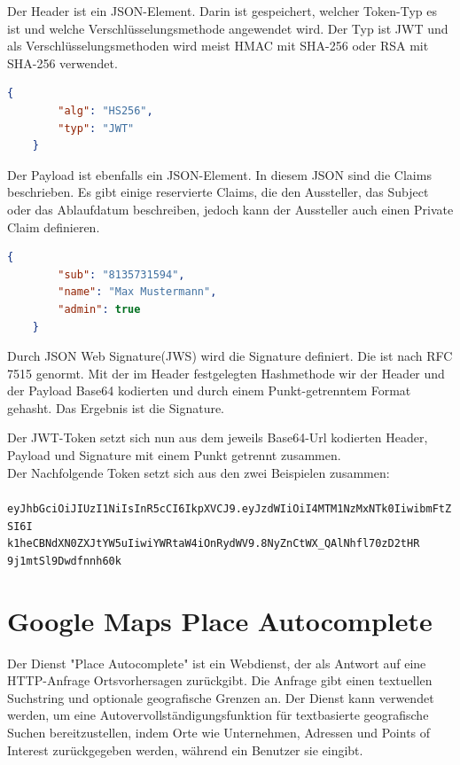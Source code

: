 Der Header ist ein JSON-Element. Darin ist gespeichert, welcher Token-Typ es ist und welche Verschlüsselungsmethode angewendet wird. Der Typ ist JWT und als Verschlüsselungsmethoden wird meist HMAC mit SHA-256 oder RSA mit SHA-256 verwendet. \autocite{wikiJWT} \\
\begin{lstlisting}[caption={JWT-Header Beispiel}, language=json]
	{
		"alg": "HS256",
		"typ": "JWT"
	}
\end{lstlisting}

Der Payload ist ebenfalls ein JSON-Element. In diesem JSON sind die Claims beschrieben. Es gibt einige reservierte Claims, die den Aussteller, das Subject oder das Ablaufdatum beschreiben, jedoch kann der Aussteller auch einen Private Claim definieren. \autocite{wikiJWT} \\
\begin{lstlisting}[caption={JWT-Payload Beispiel}, language=json]
	{
		"sub": "8135731594",
		"name": "Max Mustermann",
		"admin": true
	}
\end{lstlisting}

Durch JSON Web Signature(JWS) wird die Signature definiert. Die ist nach RFC 7515 genormt. Mit der im Header festgelegten Hashmethode wir der Header und der Payload Base64 kodierten und durch einem Punkt-getrenntem Format gehasht. Das Ergebnis ist die Signature. \autocite{wikiJWT}

Der JWT-Token setzt sich nun aus dem jeweils Base64-Url kodierten Header, Payload und Signature mit einem Punkt getrennt zusammen. \autocite{wikiJWT} \\
Der Nachfolgende Token setzt sich aus den zwei Beispielen zusammen:\\
\texttt{
	eyJhbGciOiJIUzI1NiIsInR5cCI6IkpXVCJ9.eyJzdWIiOiI4MTM1NzMxNTk0IiwibmFtZSI6I\\k1heCBNdXN0ZXJtYW5uIiwiYWRtaW4iOnRydWV9.8NyZnCtWX\_QAlNhfl70zD2tHR\\9j1mtSl9Dwdfnnh60k
}

\section{Google Maps Place Autocomplete}

Der Dienst "Place Autocomplete" ist ein Webdienst, der als Antwort auf eine HTTP-Anfrage Ortsvorhersagen zurückgibt. Die Anfrage gibt einen textuellen Suchstring und optionale geografische Grenzen an. Der Dienst kann verwendet werden, um eine Autovervollständigungsfunktion für textbasierte geografische Suchen bereitzustellen, indem Orte wie Unternehmen, Adressen und Points of Interest zurückgegeben werden, während ein Benutzer sie eingibt.\cite{googlePlacesAPI}

